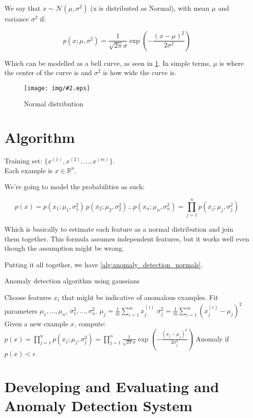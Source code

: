 \documentclass[10pt]{extarticle}
\newcommand{\stdfig}[3]{
    \begin{figure}
    \centering
    \texttt{[image: img/\#2.eps]}
    \caption{#3}
    \label{fig:#2}
    \end{figure}
}
\begin{document}
We say that $x \sim \mathcal{N}(\mu, \sigma^2)$ (x is distributed as
Normal), with mean $\mu$ and variance $\sigma^2$ if:

\[ p(x;\mu,\sigma^2) = \frac{1}{\sqrt{2\pi}\sigma} \exp(- \frac{(x - \mu)^2}{2\sigma^2}) \]

Which can be modelled as a bell curve, as seen in
\cref{fig:normal_distribution}. In simple terms, $\mu$ is where the
center of the curve is and $\sigma^2$ is how wide the curve is.

\stdfig{8cm}{normal_distribution}{Normal distribution}

\section{Algorithm}\label{algorithm}

Training set: $\{x^{(1)}, x^{(2)}, \dots, x^{(m)}\}$.\\Each example is
$x \in \mathbb{R}^n$.

We're going to model the probabilities as such:

\[ p(x) = p(x_1;\mu_1,\sigma_1^2) \, p(x_2;\mu_2,\sigma_2^2) \dots p(x_n;\mu_n,\sigma_n^2) = \prod_{j=1}^n p(x_j; \mu_j, \sigma_j^2) \]

Which is basically to estimate each feature as a normal distribution and
join them together. This formula assumes independent features, but it
works well even though the assumption might be wrong.

Putting it all together, we have \cref{alg:anomaly_detection_normals}.

\begin{algorithm}
\caption{Anomaly detection algorithm using gaussians} \label{alg:anomaly_detection_normals}
\begin{algorithmic}[1]
\State Choose features $x_i$ that might be indicative of anomalous examples.
\State Fit parameters $\mu_1, \dots, \mu_n$, $\sigma_1^2, \dots, \sigma^2_n$.
\State \indent $\mu_j = \frac{1}{m}\sum_{i=1}^m x_j^{(i)}$
\State \indent $\sigma^2_j = \frac{1}{m}\sum_{i=1}^m (x_j^{(i)} - \mu_j)^2$ 
\State Given a new example $x$, compute:
\State \indent $p(x) = \prod_{j=1}^n p(x_j; \mu_j, \sigma_j^2) = \prod_{j=1}^n \frac{1}{\sqrt{2\pi}\sigma} \exp(- \frac{(x_j - \mu_j)^2}{2\sigma_j^2}) $
\State Anomaly if $p(x) < \epsilon$
\end{algorithmic}
\end{algorithm}

\section{Developing and Evaluating and Anomaly Detection
System}\label{developing-and-evaluating-and-anomaly-detection-system}
\end{document}
